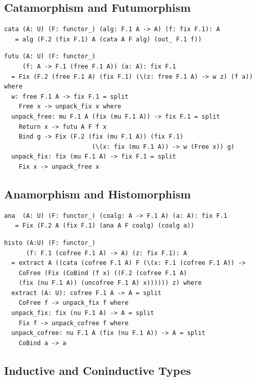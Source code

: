 \documentclass{article}
\begin{document}
\subsection{Catamorphism and Futumorphism}

\begin{lstlisting}[mathescape=true]
cata (A: U) (F: functor_) (alg: F.1 A -> A) (f: fix F.1): A
   = alg (F.2 (fix F.1) A (cata A F alg) (out_ F.1 f))
\end{lstlisting}

\begin{lstlisting}[mathescape=true]
futu (A: U) (F: functor_)
     (f: A -> F.1 (free F.1 A)) (a: A): fix F.1
  = Fix (F.2 (free F.1 A) (fix F.1) (\(z: free F.1 A) -> w z) (f a)) where
  w: free F.1 A -> fix F.1 = split
    Free x -> unpack_fix x where
  unpack_free: mu F.1 A (fix (mu F.1 A)) -> fix F.1 = split
    Return x -> futu A F f x
    Bind g -> Fix (F.2 (fix (mu F.1 A)) (fix F.1)
                        (\(x: fix (mu F.1 A)) -> w (Free x)) g)
  unpack_fix: fix (mu F.1 A) -> fix F.1 = split
    Fix x -> unpack_free x
\end{lstlisting}

\subsection{Anamorphism and Histomorphism}

\begin{lstlisting}[mathescape=true]
ana  (A: U) (F: functor_) (coalg: A -> F.1 A) (a: A): fix F.1
   = Fix (F.2 A (fix F.1) (ana A F coalg) (coalg a))
\end{lstlisting}

\begin{lstlisting}[mathescape=true]
histo (A:U) (F: functor_)
      (f: F.1 (cofree F.1 A) -> A) (z: fix F.1): A
  = extract A ((cata (cofree F.1 A) F (\(x: F.1 (cofree F.1 A)) ->
    CoFree (Fix (CoBind (f x) ((F.2 (cofree F.1 A)
    (fix (nu F.1 A)) (uncofree F.1 A) x)))))) z) where
  extract (A: U): cofree F.1 A -> A = split
    CoFree f -> unpack_fix f where
  unpack_fix: fix (nu F.1 A) -> A = split
    Fix f -> unpack_cofree f where
  unpack_cofree: nu F.1 A (fix (nu F.1 A)) -> A = split
    CoBind a -> a
\end{lstlisting}

\subsection{Inductive and Coninductive Types}
\end{document}
